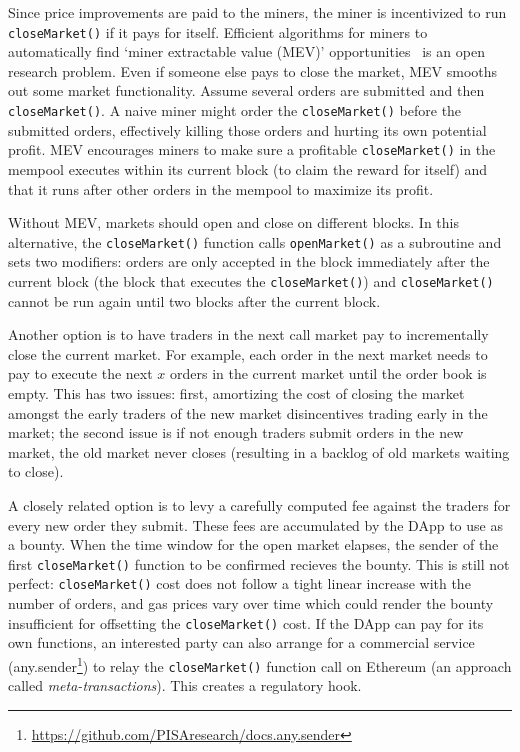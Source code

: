 Since price improvements are paid to the miners, the miner is incentivized to run \texttt{closeMarket()} if it pays for itself. Efficient algorithms for miners to automatically find `miner extractable value (MEV)' opportunities~\cite{daian2019flash} is an open research problem. Even if someone else pays to close the market, MEV smooths out some market functionality. Assume several orders are submitted and then \texttt{closeMarket()}. A naive miner might order the \texttt{closeMarket()} before the submitted orders, effectively killing those orders and hurting its own potential profit. MEV encourages miners to make sure a profitable \texttt{closeMarket()} in the mempool executes within its current block (to claim the reward for itself) and that it runs after other orders in the mempool to maximize its profit.

Without MEV, markets should open and close on different blocks. In this alternative, the \texttt{closeMarket()} function calls \texttt{openMarket()} as a subroutine and sets two modifiers: orders are only accepted in the block immediately after the current block (\ie the block that executes the \texttt{closeMarket()}) and \texttt{closeMarket()} cannot be run again until two blocks after the current block.

Another option is to have traders in the next call market pay to incrementally close the current market. For example, each order in the next market needs to pay to execute the next $x$ orders in the current market until the order book is empty. This has two issues: first, amortizing the cost of closing the market amongst the early traders of the new market disincentives trading early in the market; the second issue is if not enough traders submit orders in the new market, the old market never closes (resulting in a backlog of old markets waiting to close). 

A closely related option is to levy a carefully computed fee against the traders for every new order they submit. These fees are accumulated by the DApp to use as a bounty. When the time window for the open market elapses, the sender of the first \texttt{closeMarket()} function to be confirmed recieves the bounty. This is still not perfect: \texttt{closeMarket()} cost does not follow a tight linear increase with the number of orders, and gas prices vary over time which could render the bounty insufficient for offsetting the \texttt{closeMarket()} cost.  If the DApp can pay for its own functions, an interested party can also arrange for a commercial service (\eg any.sender\footnote{\url{https://github.com/PISAresearch/docs.any.sender}}) to relay the \texttt{closeMarket()} function call on Ethereum (an approach called \textit{meta-transactions}). This creates a regulatory hook.

